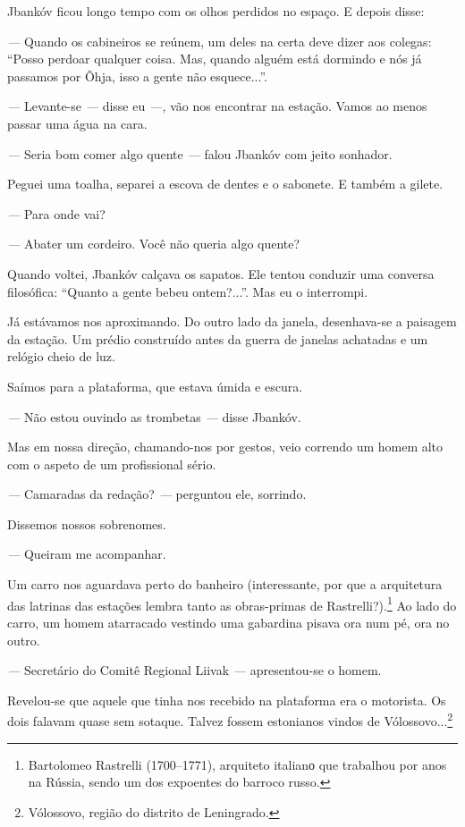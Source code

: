Jbankóv ficou longo tempo com os olhos perdidos no espaço. E depois
disse:

\emph{---} Quando os cabineiros se reúnem, um deles na certa deve dizer
aos colegas: ``Posso perdoar qualquer coisa. Mas, quando alguém está
dormindo e nós já passamos por Õhja, isso a gente não esquece...''.

\emph{---} Levante-se \emph{---} disse eu \emph{---,} vão nos encontrar
na estação. Vamos ao menos passar uma água na cara.

\emph{---} Seria bom comer algo quente \emph{---} falou Jbankóv com
jeito sonhador.

Peguei uma toalha, separei a escova de dentes e o sabonete. E também a
gilete.

\emph{---} Para onde vai?

\emph{---} Abater um cordeiro. Você não queria algo quente?

Quando voltei, Jbankóv calçava os sapatos. Ele tentou conduzir uma
conversa filosófica: ``Quanto a gente bebeu ontem?...''. Mas eu o
interrompi.

Já estávamos nos aproximando. Do outro lado da janela, desenhava-se a
paisagem da estação. Um prédio construído antes da guerra de janelas
achatadas e um relógio cheio de luz.

Saímos para a plataforma, que estava úmida e escura.

\emph{---} Não estou ouvindo as trombetas \emph{---} disse Jbankóv.

Mas em nossa direção, chamando-nos por gestos, veio correndo um homem
alto com o aspeto de um profissional sério.

\emph{---} Camaradas da redação? \emph{---} perguntou ele, sorrindo.

Dissemos nossos sobrenomes.

\emph{---} Queiram me acompanhar.

Um carro nos aguardava perto do banheiro (interessante, por que a
arquitetura das latrinas das estações lembra tanto as obras-primas de
Rastrelli?).\footnote{Bartolomeo Rastrelli (1700--1771), arquiteto
  italianо que trabalhou por anos na Rússia, sendo um dos expoentes do
  barroco russo.} Ao lado do carro, um homem atarracado vestindo uma
gabardina pisava ora num pé, ora no outro.

\emph{---} Secretário do Comitê Regional Liivak \emph{---} apresentou-se
o homem.

Revelou-se que aquele que tinha nos recebido na plataforma era o
motorista. Os dois falavam quase sem sotaque. Talvez fossem estonianos
vindos de Vólossovo...\footnote{Vólossovo, região do distrito de
  Leningrado.}

